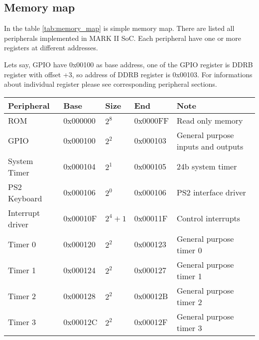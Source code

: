 \subsection{Memory map}

In the table \ref{tab:memory_map} is simple memory map. There are listed all
peripherals implemented in MARK II SoC. Each peripheral have one or more registers at different
addresses.

Lets say, GPIO have 0x00100 as base address, one of the GPIO register
is DDRB register with offset +3, so address of DDRB register is 0x00103. For
informations about individual register please see corresponding peripheral sections.

\begin{table}[h]
    \centering
    \begin{tabular}{|l|l|l|l|l|}
        \hline
        \textbf{Peripheral} & \textbf{Base} & \textbf{Size} & \textbf{End} & \textbf{Note}                                  \\ \hline
        ROM                 & 0x000000      & $2^{8}$       & 0x0000FF     & Read only memory                               \\ \hline
        GPIO                & 0x000100      & $2^{2}$       & 0x000103     & General purpose inputs and outputs             \\ \hline
        System Timer        & 0x000104      & $2^{1}$       & 0x000105     & 24b system timer                               \\ \hline
        PS2 Keyboard        & 0x000106      & $2^{0}$       & 0x000106     & PS2 interface driver                           \\ \hline
        Interrupt driver    & 0x00010F      & $2^{4} + 1$   & 0x00011F     & Control interrupts                             \\ \hline
        Timer 0             & 0x000120      & $2^{2}$       & 0x000123     & General purpose timer 0                        \\ \hline
        Timer 1             & 0x000124      & $2^{2}$       & 0x000127     & General purpose timer 1                        \\ \hline
        Timer 2             & 0x000128      & $2^{2}$       & 0x00012B     & General purpose timer 2                        \\ \hline
        Timer 3             & 0x00012C      & $2^{2}$       & 0x00012F     & General purpose timer 3                        \\ \hline

\end{tabular}
\end{table}

